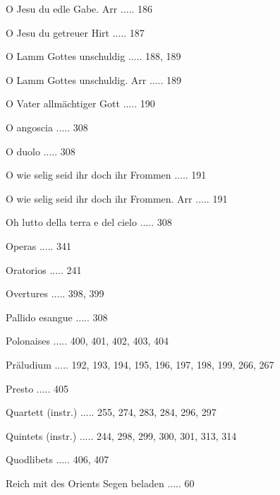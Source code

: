 \documentclass[twocolumn]{book}
\begin{document}
\newline 
O Jesu du edle Gabe. Arr ..... 186

\newline 
O Jesu du getreuer Hirt ..... 187

\newline 
O Lamm Gottes unschuldig ..... 188, 189

\newline 
O Lamm Gottes unschuldig. Arr ..... 189

\newline 
O Vater allmächtiger Gott ..... 190

\newline 
O angoscia ..... 308

\newline 
O duolo ..... 308

\newline 
O wie selig seid ihr doch ihr Frommen ..... 191

\newline 
O wie selig seid ihr doch ihr Frommen. Arr ..... 191

\newline 
Oh lutto della terra e del cielo ..... 308

\newline 
Operas ..... 341

\newline 
Oratorios ..... 241

\newline 
Overtures ..... 398, 399

\newline 
Pallido esangue ..... 308

\newline 
Polonaises ..... 400, 401, 402, 403, 404

\newline 
Präludium ..... 192, 193, 194, 195, 196, 197, 198, 199, 266, 267

\newline 
Presto ..... 405

\newline 
Quartett (instr.) ..... 255, 274, 283, 284, 296, 297

\newline 
Quintets (instr.) ..... 244, 298, 299, 300, 301, 313, 314

\newline 
Quodlibets ..... 406, 407

\newline 
Reich mit des Orients Segen beladen ..... 60
\end{document}
